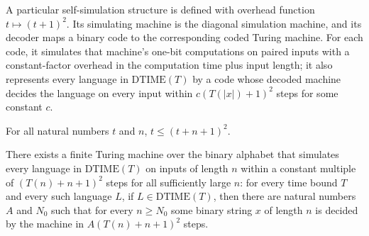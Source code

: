 \begin{definition}
\label{Complexity.TimeHierarchy.oneTapeSelfSimulator}
\leanok
{}
A particular self-simulation structure is defined with overhead function $t \mapsto
(t+1)^2$. Its simulating machine is the diagonal simulation machine, and its decoder
maps a binary code to the corresponding coded Turing machine. For each code, it
simulates that machine's one-bit computations on paired inputs with a constant-factor
overhead in the computation time plus input length; it also represents every language in
$\mathrm{DTIME}(T)$ by a code whose decoded machine decides the language on every input
within $c(T(|x|)+1)^2$ steps for some constant $c$.
\end{definition}

\begin{theorem}
\label{Complexity.TimeHierarchy.le_sq_overhead}
\leanok
{}
For all natural numbers $t$ and $n$, $t \le (t+n+1)^2$.
\end{theorem}

\begin{definition}
\label{Complexity.TimeHierarchy.sqDiagSimulator}
\leanok
{}
There exists a finite Turing machine over the binary alphabet that simulates every
language in $\mathrm{DTIME}(T)$ on inputs of length $n$ within a constant multiple of
$(T(n)+n+1)^2$ steps for all sufficiently large $n$: for every time bound $T$ and every
such language $L$, if $L\in\mathrm{DTIME}(T)$, then there are natural numbers $A$ and
$N_0$ such that for every $n\ge N_0$ some binary string $x$ of length $n$ is decided by
the machine in $A(T(n)+n+1)^2$ steps.
\end{definition}

